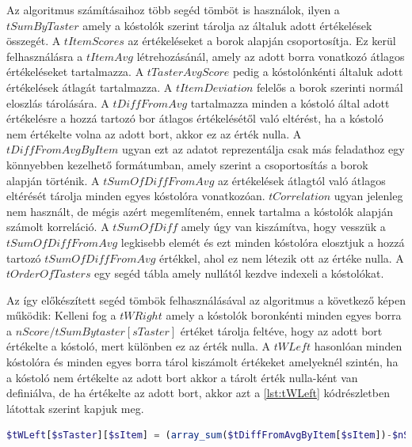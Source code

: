 \documentclass[12pt]{report}
\theoremstyle{definition}
\begin{document}
	Az algoritmus számításaihoz több segéd tömböt is használok, ilyen a $tSumByTaster$ amely a kóstolók szerint tárolja az általuk adott értékelések összegét. A $tItemScores$ az értékeléseket a borok alapján csoportosítja. Ez kerül felhasználásra a $tItemAvg$ létrehozásánál, amely az adott borra vonatkozó átlagos értékeléseket tartalmazza. A \linebreak$tTasterAvgScore$ pedig a kóstolónkénti általuk adott értékelések átlagát tartalmazza. A $tItemDeviation$ felelős a borok szerinti normál eloszlás tárolására. A $tDiffFromAvg$ tartalmazza minden a kóstoló által adott értékelésre a hozzá tartozó bor átlagos értékelésétől való eltérést, ha a kóstoló nem értékelte volna az adott bort, akkor ez az érték nulla. A $tDiffFromAvgByItem$ ugyan ezt az adatot reprezentálja csak más feladathoz egy könnyebben kezelhető formátumban, amely szerint a csoportosítás a borok alapján történik. A $tSumOfDiffFromAvg$ az értékelések átlagtól való átlagos eltérését tárolja minden egyes kóstolóra vonatkozóan. $tCorrelation$ ugyan jelenleg nem használt, de mégis azért megemlíteném, ennek tartalma a kóstolók alapján számolt korreláció. A $tSumOfDiff$ amely úgy van kiszámítva, hogy vesszük a $tSumOfDiffFromAvg$ legkisebb elemét és ezt minden kóstolóra elosztjuk a hozzá tartozó $tSumOfDiffFromAvg$ értékkel, ahol ez nem létezik ott az értéke nulla. A $tOrderOfTasters$ egy segéd tábla amely nullától kezdve indexeli a kóstolókat.
	
	Az így előkészített segéd tömbök felhasználásával az algoritmus a következő képen működik: Kelleni fog a $tWRight$ amely a kóstolók boronkénti minden egyes borra a $nScore/tSumBytaster\left[sTaster\right]$ értéket tárolja feltéve, hogy az adott bort értékelte a kóstoló, mert különben ez az érték nulla. A $tWLeft$ hasonlóan minden kóstolóra és minden egyes borra tárol kiszámolt értékeket amelyeknél szintén, ha a kóstoló nem értékelte az adott bort akkor a tárolt érték nulla-ként van definiálva, de ha értékelte az adott bort, akkor azt a \ref{lst:tWLeft} kódrészletben látottak szerint kapjuk meg.
	
	\noindent\begin{minipage}{\linewidth}
		\begin{lstlisting}[language=php,label={lst:tWLeft}, caption={tWLeft értékének kiszámítása}]
$tWLeft[$sTaster][$sItem] = (array_sum($tDiffFromAvgByItem[$sItem])-$nScore)/((count($tItemScores[$sItem])-1)*array_sum($tDiffFromAvgByItem[$sItem]));
		\end{lstlisting}
	\end{minipage}
	
\end{document}
